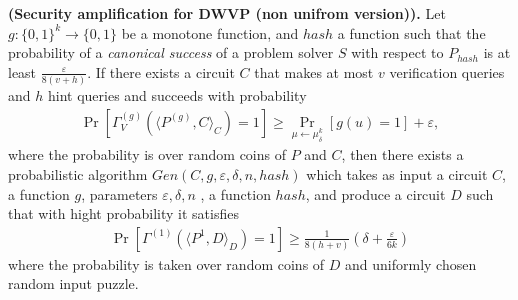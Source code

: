 \begin{theorem} {\textbf{(Security amplification for DWVP (non unifrom version)).}}
  Let $g: \{0,1\}^k \rightarrow \{0,1\}$ be a monotone function, and $hash$ a function such that
  the probability of a \textit{canonical success} of a problem solver $S$ with respect to $P_{hash}$ is at least $\frac{\varepsilon}{8\left(v + h\right)}$.
  If there exists a circuit $C$ that makes at most $v$ verification queries and $h$ hint queries
  and succeeds with probability
  \begin{align}
    \Pr_{}[\Gamma_{V}^{(g)}( \langle P^{(g)},C \rangle_C ) = 1] \geq \Pr_{\mu \leftarrow \mu_{\delta}^{k}}[g(u) = 1] + \varepsilon ,
  \end{align}
  where the probability is over random coins of $P$ and $C$,
  then there exists a probabilistic algorithm $Gen(C, g, \varepsilon, \delta, n, hash)$ which takes as input a circuit $C$, a function $g$,
  parameters $\varepsilon, \delta, n$ , a function $hash$, and
  produce a circuit $D$ such that with hight probability
  it satisfies
  \begin{align}
    \Pr_{}[\Gamma^{(1)} \left( \langle P^{1} ,D \rangle_D \right) = 1] \geq \frac{1}{8(h+v)} \left( \delta + \frac{\varepsilon}{6k} \right)
  \end{align}
  where the probability is taken over random coins of $D$ and uniformly chosen random input puzzle.
\end{theorem}



